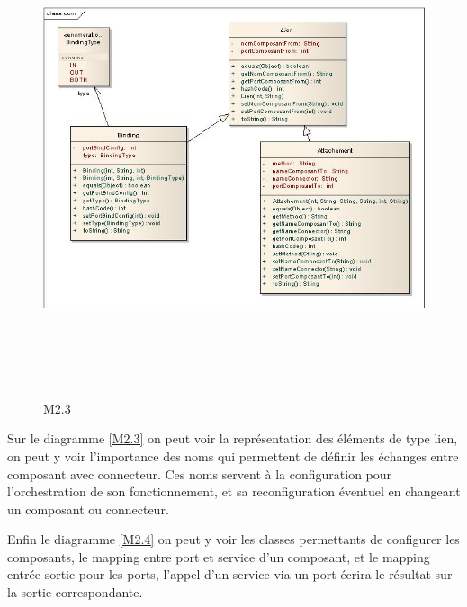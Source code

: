\documentclass[11pt,a4paper]{article}
\begin{document}
\begin{figure}[h]
  		\centering
  		\includegraphics[height=14cm,width=15cm]{comimpl.jpg}
  		\caption{M2.3}
  		\label{Représentation des liens}
\end{figure}

Sur le diagramme \ref{M2.3} on peut voir la représentation des éléments de type lien, on peut y voir l'importance des noms qui permettent de définir les échanges entre composant avec connecteur. Ces noms servent à la configuration pour l'orchestration de son fonctionnement, et sa reconfiguration éventuel en changeant un composant ou connecteur.

Enfin le diagramme \ref{M2.4} on peut y voir les classes permettants de configurer les composants, le mapping entre port et service d'un composant, et le mapping entrée sortie pour les ports, l'appel d'un service via un port écrira le résultat sur la sortie correspondante.
\end{document}
